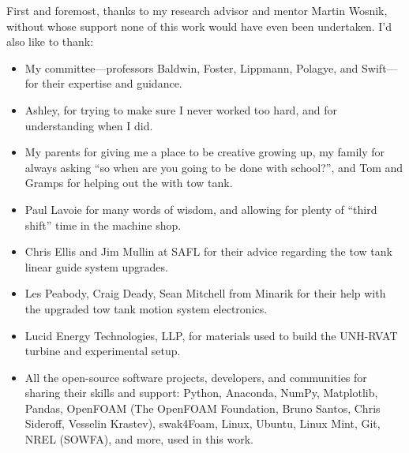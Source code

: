 



\begin{Acknowledgments}
\setlength{\baselineskip}{1.5\baselineskip}
{

    First and foremost, thanks to my research advisor and mentor Martin Wosnik,
    without whose support none of this work would have even been undertaken. I'd
    also like to thank:

    \begin{itemize}

        \item My committee---professors Baldwin, Foster, Lippmann, Polagye, and
        Swift---for their expertise and guidance.

        \item Ashley, for trying to make sure I never worked too hard, and for
        understanding when I did.

        \item My parents for giving me a place to be creative growing up, my
        family for always asking ``so when are you going to be done with
        school?'', and Tom and Gramps for helping out the with tow tank.

        \item Paul Lavoie for many words of wisdom, and allowing for plenty of
        ``third shift'' time in the machine shop.

        \item Chris Ellis and Jim Mullin at SAFL for their advice regarding the
        tow tank linear guide system upgrades.

        \item Les Peabody, Craig Deady, Sean Mitchell from Minarik for their
        help with the upgraded tow tank motion system electronics.

        \item Lucid Energy Technologies, LLP, for materials used to build the
        UNH-RVAT turbine and experimental setup.

        \item All the open-source software projects, developers, and communities
        for sharing their skills and support: Python, Anaconda, NumPy,
        Matplotlib, Pandas, OpenFOAM (The OpenFOAM Foundation, Bruno Santos,
        Chris Sideroff, Vesselin Krastev), swak4Foam, Linux, Ubuntu, Linux Mint,
        Git, NREL (SOWFA), and more, used in this work.


\end{itemize}}
\end{Acknowledgments}
